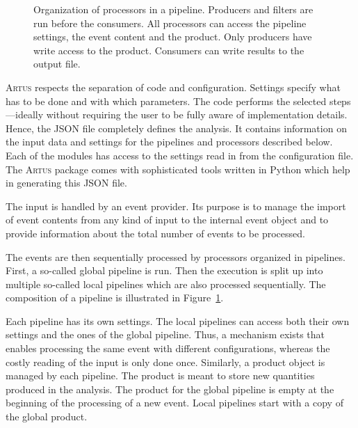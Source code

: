 \documentclass[3p]{elsarticle}
\newcommand{\software}[1]{\textsc{#1}\xspace}
\newcommand{\artus}{\software{Artus}}
\begin{document}
\begin{figure}[p]
\centering 
\caption[Structure of an \artus analysis.]{Structure of an \artus analysis.
The input is read by an event provider.
Within the pipelines the event content is analyzed by the processors.
Consumers in local pipelines write results to a common output.
All parts of the analysis are configurable.}
\label{figure_artus_structure}

\vspace{10ex}

\centering 
\caption[Organization of processors in a pipeline.]{Organization of processors in a pipeline.
Producers and filters are run before the consumers.
All processors can access the pipeline settings, the event content and the product.
Only producers have write access to the product.
Consumers can write results to the output file.}
\label{figure_artus_pipeline}
\end{figure}

\artus respects the separation of code and configuration.
Settings specify what has to be done and with which parameters.
The code performs the selected steps---ideally without requiring the user to be fully aware of implementation details.
Hence, the JSON file completely defines the analysis.
It contains information on the input data and settings for the pipelines and processors described below.
Each of the modules has access to the settings read in from the configuration file.
The \artus package comes with sophisticated tools written in Python which help in generating this JSON file.

The input is handled by an event provider.
Its purpose is to manage the import of event contents from any kind of input to the internal event object and to provide information about the total number of events to be processed.

The events are then sequentially processed by processors organized in pipelines.
First, a so-called global pipeline is run.
Then the execution is split up into multiple so-called local pipelines which are also processed sequentially.
The composition of a pipeline is illustrated in Figure~\ref{figure_artus_pipeline}.

Each pipeline has its own settings.
The local pipelines can access both their own settings and the ones of the global pipeline.
Thus, a mechanism exists that enables processing the same event with different configurations, whereas the costly reading of the input is only done once.
Similarly, a product object is managed by each pipeline.
The product is meant to store new quantities produced in the analysis.
The product for the global pipeline is empty at the beginning of the processing of a new event.
Local pipelines start with a copy of the global product.
\end{document}
